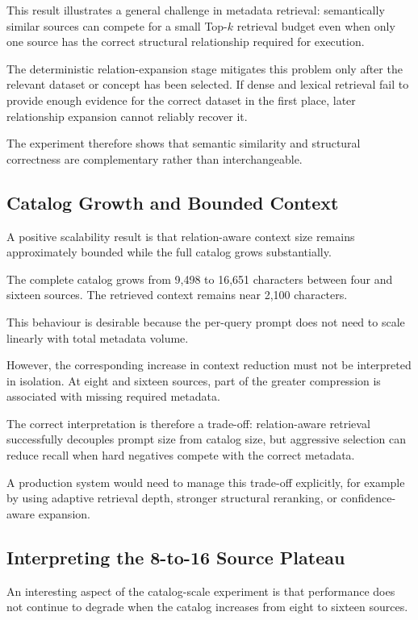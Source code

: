 This result illustrates a general challenge in metadata retrieval:
semantically similar sources can compete for a small Top-\(k\) retrieval
budget even when only one source has the correct structural relationship
required for execution.

The deterministic relation-expansion stage mitigates this problem only after
the relevant dataset or concept has been selected. If dense and lexical
retrieval fail to provide enough evidence for the correct dataset in the
first place, later relationship expansion cannot reliably recover it.

The experiment therefore shows that semantic similarity and structural
correctness are complementary rather than interchangeable.


\subsection{Catalog Growth and Bounded Context}

A positive scalability result is that relation-aware context size remains
approximately bounded while the full catalog grows substantially.

The complete catalog grows from 9,498 to 16,651 characters between four and
sixteen sources. The retrieved context remains near 2,100 characters.

This behaviour is desirable because the per-query prompt does not need to
scale linearly with total metadata volume.

However, the corresponding increase in context reduction must not be
interpreted in isolation. At eight and sixteen sources, part of the greater
compression is associated with missing required metadata.

The correct interpretation is therefore a trade-off: relation-aware retrieval
successfully decouples prompt size from catalog size, but aggressive selection
can reduce recall when hard negatives compete with the correct metadata.

A production system would need to manage this trade-off explicitly, for
example by using adaptive retrieval depth, stronger structural reranking, or
confidence-aware expansion.


\subsection{Interpreting the 8-to-16 Source Plateau}

An interesting aspect of the catalog-scale experiment is that performance does
not continue to degrade when the catalog increases from eight to sixteen
sources.

